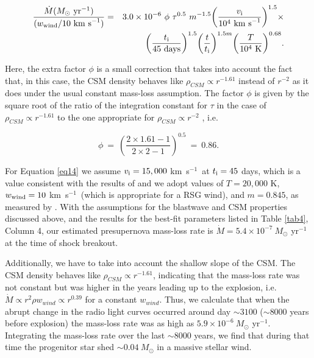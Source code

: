 \documentclass[12pt,preprint]{aastex}
\newcommand{\kms}{km~s$^{-1}$}
\begin{document}
\begin{eqnarray}
\label{eq14}
\frac{\dot M (M_\odot\ {\rm yr}^{-1})}{( w_{\rm wind} / 10\ {\rm km\
s}^{-1} )} & = & 3.0 \times 10^{-6}\ \phi \ \tau^{0.5} \ m^{-1.5}
{\left(\frac{v_{\rm i}}{10^{4}\ {\rm km\ s}^{-1}}\right)}^{1.5} \times
\nonumber \\ & & {\left(\frac{t_{\rm i}}{45\ {\rm days}}\right) }^{1.5}
{\left(\frac{t}{t_{\rm i}}\right) }^{1.5 m}{\left(\frac{T}{10^{4}\ {\rm
K}} \right)}^{0.68} .
\end{eqnarray}

\noindent Here, the extra factor $\phi$ is a small correction that takes into account the fact that, in this case, the CSM density behaves like $\rho_{CSM} \propto r^{-1.61}$ instead of  $r^{-2}$ as it does under
the usual constant mass-loss assumption. The
factor  $\phi$ is given by the square root of the ratio of the
integration constant for $\tau$  in the case of $\rho_{CSM} \propto 
r^{-1.61}$ to the one appropriate for $\rho_{CSM} \propto  r^{-2}$ , i.e.

\begin{equation}
\label{eq15}
\phi \ = \ \left(\frac{2\times 1.61-1}{2\times 2 - 1}\right)^{0.5} \ = \ 0.86 .
\end{equation}

\noindent For Equation \ref{eq14} we assume $v_{\rm i} = 15,000$ \kms\ at $t_{\rm i} = 45$ days, which is
a value consistent with the results of \cite{Marcaide07} and we adopt values of $T = 20,000$ K, $w_{\rm wind} = 10$ \kms\ (which is appropriate for a RSG wind), and $m=0.845$, as measured  by \cite{Marcaide07}.   With the assumptions for the blastwave and CSM properties discussed above, and the results for the best-fit parameters
listed in Table \ref{tab4}, Column 4, our estimated presupernova mass-loss rate is $\dot M = 5.4\times 10^{-7}\ M_\odot$ yr$^{-1}$ at the time of shock breakout.  

Additionally, we have to take into account the shallow slope of the CSM. The CSM density behaves like $\rho_{CSM} \propto  r^{-1.61}$, indicating that the mass-loss rate was not constant but was higher in the years
leading up to the explosion, i.e. $\dot M \propto r^2 \rho w_{wind} \propto r^{0.39}$ for a constant  $w_{wind}$.   Thus, we calculate that when the abrupt change in the radio light curves occurred around day $\sim3100$ ($\sim8000$ years before explosion) the mass-loss rate was as high as $5.9\times 10^{-6}\ M_\odot$ yr$^{-1}$. Integrating the mass-loss rate over the last $\sim8000$ years, we find that during that time the progenitor star shed $\sim 0.04~M_\odot$ in a massive stellar wind. 
\end{document}
